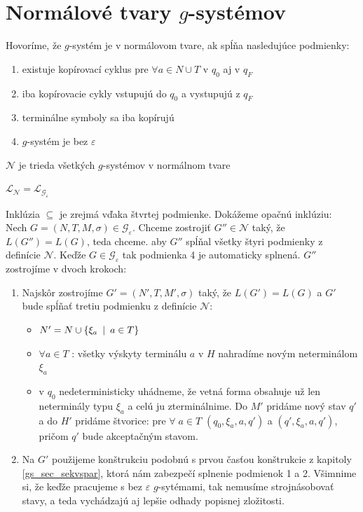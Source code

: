 \section{Normálové tvary $g$-systémov}

\begin{definicia}
  Hovoríme, že $g$-systém je v normálovom tvare, ak spĺňa
  nasledujúce podmienky:
  \begin{enumerate}
    \item existuje kopírovací cyklus pre $\forall a\in N\cup T$ v $q_0$ aj v $q_F$
    \item iba kopírovacie cykly vstupujú do $q_0$ a vystupujú z $q_F$
    \item terminálne symboly sa iba kopírujú
    \item $g$-systém je bez $\varepsilon$
  \end{enumerate}
\end{definicia}

\begin{oznacenie}
  $\mathcal{N}$ je trieda všetkých $g$-systémov v normálnom tvare
\end{oznacenie}

\begin{veta}
  $\mathcal{L}_{\mathcal{N}}=\mathcal{L}_{\mathcal{G}_{\varepsilon}}$
\end{veta}

\begin{dokaz}
  Inklúzia $\subseteq$ je zrejmá vďaka štvrtej podmienke. Dokážeme
  opačnú inklúziu: \\ Nech
  $G=(N,T,M,\sigma)\in\mathcal{G}_\varepsilon$. Chceme zostrojiť
  $G''\in\mathcal{N}$ taký, že $L(G'')=L(G)$, teda chceme. aby $G''$
  spĺňal všetky štyri podmienky z definície $\mathcal{N}$. Keďže
  $G\in\mathcal{G}_\varepsilon$ tak podmienka 4 je automaticky
  splnená. $G''$ zostrojíme v dvoch krokoch:
  \begin{enumerate}
    \item Najskôr zostrojíme $G'=(N',T,M',\sigma)$ taký, že $L(G')=L(G)$ a $G'$ bude
    spĺňať tretiu podmienku z definície $\mathcal{N}$:
    \begin{itemize}
      \item $N'=N\cup\{\xi_a\enspace |\enspace a\in T\}$
      \item $\forall a\in T$ : všetky výskyty
      terminálu $a$ v $H$ nahradíme novým neterminálom $\xi_a$
      \item v $q_0$ nedeterministicky uhádneme, že vetná forma
      obsahuje už len neterminály typu $\xi_a$ a celú ju
      zterminálnime. Do $M'$ pridáme nový stav $q'$ a do $H'$
      pridáme štvorice: pre $\forall\; a\in T$ $(q_0,\xi_a,a,q')$
      a $(q',\xi_a,a,q')$, pričom $q'$ bude akceptačným stavom.
    \end{itemize}
    \item Na $G'$ použijeme konštrukciu podobnú s prvou časťou
    konštrukcie z kapitoly \ref{gs_sec_sekvspar}, ktorá nám zabezpečí
    splnenie podmienok 1 a 2. Všimnime si, že keďže pracujeme s bez
    $\varepsilon$ $g$-sytémami, tak nemusíme strojnásobovať stavy, a
    teda vychádzajú aj lepšie odhady popisnej zložitosti.
  \end{enumerate}
\end{dokaz}

